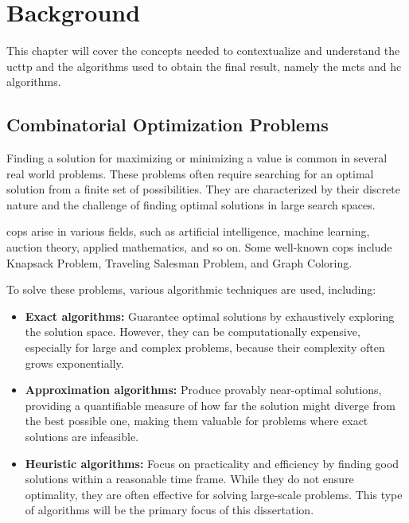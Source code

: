 
\chapter{Background}


\label{Background}

This chapter will cover the concepts needed to contextualize and understand the \ac{ucttp} and the algorithms used to obtain the final result, namely the \ac{mcts} and \ac{hc} algorithms.


\section{Combinatorial Optimization Problems}

Finding a solution for maximizing or minimizing a value is common in several real world problems. These problems often require searching for an optimal solution from a finite set of possibilities. They are characterized by their discrete nature and the challenge of finding optimal solutions in large search spaces.

\acp{cop} arise in various fields, such as artificial intelligence, machine learning, auction theory, applied mathematics, and so on. Some well-known \acp{cop} include Knapsack Problem, Traveling Salesman Problem, and Graph Coloring. 

To solve these problems, various algorithmic techniques are used, including:
\begin{itemize}
\item \textbf{Exact algorithms:} Guarantee optimal solutions by exhaustively exploring the solution space. However, they can be computationally expensive, especially for large and complex problems, because their complexity often grows exponentially.
\item \textbf{Approximation algorithms:} Produce provably near-optimal solutions, providing a quantifiable measure of how far the solution might diverge from the best possible one, making them valuable for problems where exact solutions are infeasible.
\item \textbf{Heuristic algorithms:} Focus on practicality and efficiency by finding good solutions within a reasonable time frame. While they do not ensure optimality, they are often effective for solving large-scale problems. This type of algorithms will be the primary focus of this dissertation.
\end{itemize}


